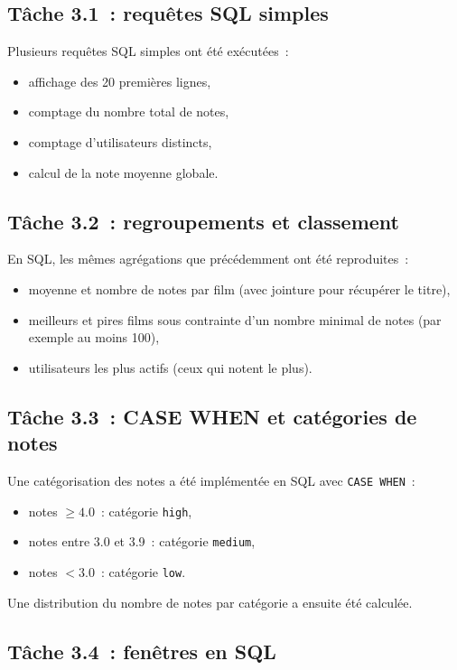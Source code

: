 \documentclass[a4paper,11pt]{article}
\begin{document}
\subsection{Tâche 3.1~: requêtes SQL simples}

Plusieurs requêtes SQL simples ont été exécutées~:
\begin{itemize}
  \item affichage des 20 premières lignes,
  \item comptage du nombre total de notes,
  \item comptage d'utilisateurs distincts,
  \item calcul de la note moyenne globale.
\end{itemize}

\subsection{Tâche 3.2~: regroupements et classement}

En SQL, les mêmes agrégations que précédemment ont été
reproduites~:
\begin{itemize}
  \item moyenne et nombre de notes par film (avec jointure
        pour récupérer le titre),
  \item meilleurs et pires films sous contrainte d'un nombre
        minimal de notes (par exemple au moins 100),
  \item utilisateurs les plus actifs (ceux qui notent le plus).
\end{itemize}

\subsection{Tâche 3.3~: CASE WHEN et catégories de notes}

Une catégorisation des notes a été implémentée en SQL avec
\texttt{CASE WHEN}~:
\begin{itemize}
  \item notes $\geq 4.0$~: catégorie \texttt{high},
  \item notes entre 3.0 et 3.9~: catégorie \texttt{medium},
  \item notes $< 3.0$~: catégorie \texttt{low}.
\end{itemize}

Une distribution du nombre de notes par catégorie a ensuite été
calculée.

\subsection{Tâche 3.4~: fenêtres en SQL}
\end{document}
